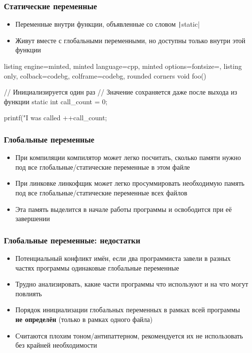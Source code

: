 \documentclass[10pt]{beamer}
\begin{document}
\begin{frame}[fragile]
\frametitle{Статические переменные}
\begin{itemize}
\item Переменные внутри функции, объявленные со словом \texttt|static|
\item Живут вместе с глобальными переменными, но доступны только внутри этой функции
\end{itemize}
\begin{tcblisting}{listing engine=minted, minted language=cpp, minted options={fontsize=\scriptsize}, listing only, colback=codebg, colframe=codebg, rounded corners}
void foo() {
  // Инициализируется один раз
  // Значение сохраняется даже после выхода из функции
  static int call_count = 0;

  printf("I was called %
  ++call_count;
}
\end{tcblisting}
\end{frame}

\begin{frame}[fragile]
\frametitle{Глобальные переменные}
\begin{itemize}
\item При компиляции компилятор может легко посчитать, сколько памяти нужно под все глобальные/статические переменные в этом файле
\pause
\item При линковке линкофщик может легко просуммировать необходимую память под все глобальные/статические переменные всех файлов
\pause
\item Эта память выделится в начале работы программы и освободится при её завершении
\end{itemize}
\end{frame}

\begin{frame}[fragile]
\frametitle{Глобальные переменные: недостатки}
\begin{itemize}
\item Потенциальный конфликт имён, если два программиста завели в разных частях программы одинаковые глобальные переменные
\pause
\item Трудно анализировать, какие части программы что используют и на что могут повлиять
\pause
\item Порядок инициализации глобальных переменных в рамках всей программы \textbf{не определён} (только в рамках одного файла)
\pause
\item Считаются плохим тоном/антипаттерном, рекомендуется их не использовать без крайней необходимости
\end{itemize}
\end{frame}
\end{document}
